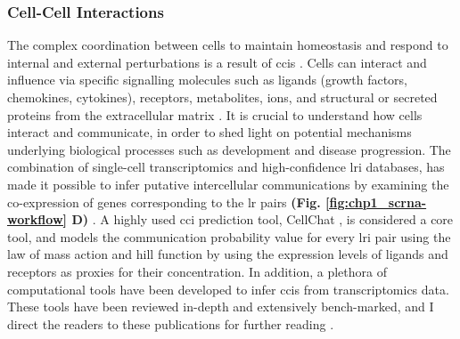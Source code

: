 \subsubsection{Cell-Cell Interactions}
\par The complex coordination between cells to maintain homeostasis and respond to internal and external perturbations is a result of \glspl{cci} \textbf{\cite{armingol_deciphering_2021}}.  %
Cells can interact and influence via specific signalling molecules such as ligands (growth factors, chemokines, cytokines), receptors, metabolites, ions, and structural or secreted proteins from the extracellular matrix \textbf{\cite{armingol_deciphering_2021,armingol_diversification_2024}}. %
It is crucial to understand how cells interact and communicate, in order to shed light on potential mechanisms underlying biological processes such as development and disease progression. The combination of single-cell transcriptomics and high-confidence \gls{lri} databases, has made it possible to infer putative intercellular communications by examining the co-expression of genes corresponding to the \gls{lr} pairs \textbf{(Fig. \ref{fig:chp1_scrna-workflow} D)} \textbf{\cite{wilk_comparative_2023}}. A highly used \gls{cci} prediction tool, CellChat \textbf{\cite{jin_inference_2021}}, is considered a core tool, and models the communication probability value for every \gls{lri} pair using the law of mass action and hill function by using the expression levels of ligands and receptors as proxies for their concentration. In addition, a plethora of computational tools have been developed to infer \glspl{cci} from transcriptomics data. These tools have been reviewed in-depth and extensively bench-marked, and I direct the readers to these publications for further reading \textbf{\cite{armingol_deciphering_2021,armingol_diversification_2024,liu_evaluation_2022,xie_comparison_2023,cheng_review_2023}}.\\

